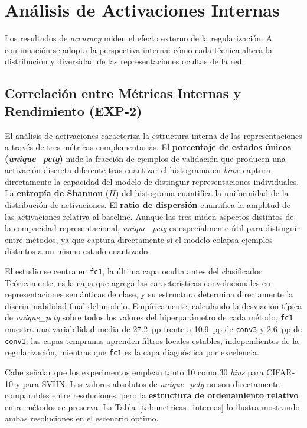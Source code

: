 \FloatBarrier
\section{Análisis de Activaciones Internas\label{CAP:resultados_activaciones}}

Los resultados de \textit{accuracy} miden el efecto externo de la regularización.
A continuación se adopta la perspectiva interna: cómo cada técnica altera la
distribución y diversidad de las representaciones ocultas de la red.

\subsection{Correlación entre Métricas Internas y Rendimiento (EXP-2)\label{sec:correlacion_metricas}}

El análisis de activaciones caracteriza la estructura interna de las representaciones
a través de tres métricas complementarias. El \textbf{porcentaje de estados únicos
(\textit{unique\_pctg})} mide la fracción de ejemplos de validación que producen una
activación discreta diferente tras cuantizar el histograma en \textit{bins}: captura
directamente la capacidad del modelo de distinguir representaciones individuales. La
\textbf{entropía de Shannon} ($H$) del histograma cuantifica la uniformidad de la
distribución de activaciones. El \textbf{ratio de dispersión} cuantifica la amplitud
de las activaciones relativa al baseline. Aunque las tres miden aspectos distintos de la
compacidad representacional, \textit{unique\_pctg} es especialmente útil para distinguir
entre métodos, ya que captura directamente si el modelo colapsa ejemplos distintos a un
mismo estado cuantizado.

El estudio se centra en \texttt{fc1}, la última capa oculta antes del clasificador.
Teóricamente, es la capa que agrega las características convolucionales en
representaciones semánticas de clase, y su estructura determina directamente la
discriminabilidad final del modelo. Empíricamente, calculando la desviación típica de
\textit{unique\_pctg} sobre todos los valores del hiperparámetro de cada método,
\texttt{fc1} muestra una variabilidad media de 27.2~pp frente a 10.9~pp de \texttt{conv3}
y 2.6~pp de \texttt{conv1}: las capas tempranas aprenden filtros locales estables,
independientes de la regularización, mientras que \texttt{fc1} es la capa diagnóstica
por excelencia.

Cabe señalar que los experimentos emplean tanto 10 como 30 \textit{bins} para CIFAR-10 y para SVHN. Los
valores absolutos de \textit{unique\_pctg} no son directamente comparables entre
resoluciones, pero la \textbf{estructura de ordenamiento relativo} entre métodos se
preserva. La Tabla~\ref{tab:metricas_internas} lo ilustra mostrando ambas resoluciones
en el escenario óptimo.

